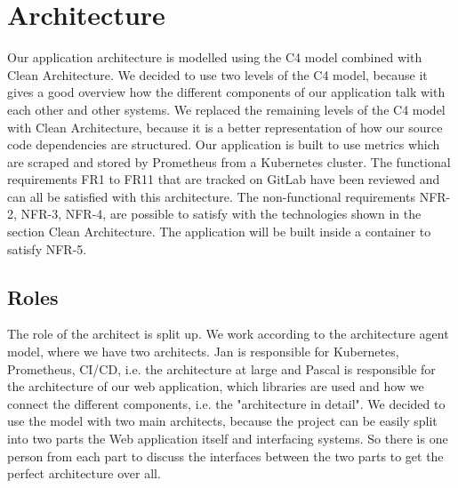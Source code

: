 \chapter{Architecture}



Our application architecture is modelled using the C4 model combined with Clean Architecture. We decided to use two levels of the C4 model, because it gives a good overview how the different components of our application talk with each other and other systems. We replaced the remaining levels of the C4 model with Clean Architecture, because it is a better representation of how our source code dependencies are structured.
Our application is built to use metrics which are scraped and stored by Prometheus from a Kubernetes cluster.
The functional requirements FR1 to FR11 that are tracked on GitLab have been reviewed and can all be satisfied with this architecture.
The non-functional requirements NFR-2, NFR-3, NFR-4, are possible to satisfy with the technologies shown in the section Clean Architecture.
The application will be built inside a container to satisfy NFR-5.

\section{Roles}
The role of the architect is split up. We work according to the architecture agent model, where we have two architects.
Jan is responsible for Kubernetes, Prometheus, CI/CD, i.e. the architecture at large
and Pascal is responsible for the architecture of our web application, which libraries are used and how we connect the different components, i.e. the "architecture in detail". We decided to use the model with two main architects, because the project can be easily split into two parts the Web application itself and interfacing systems. So there is one person from each part to discuss the interfaces between the two parts to get the perfect architecture over all.

